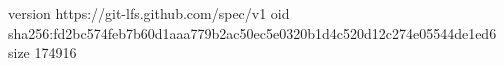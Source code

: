version https://git-lfs.github.com/spec/v1
oid sha256:fd2bc574feb7b60d1aaa779b2ac50ec5e0320b1d4c520d12c274e05544de1ed6
size 174916
